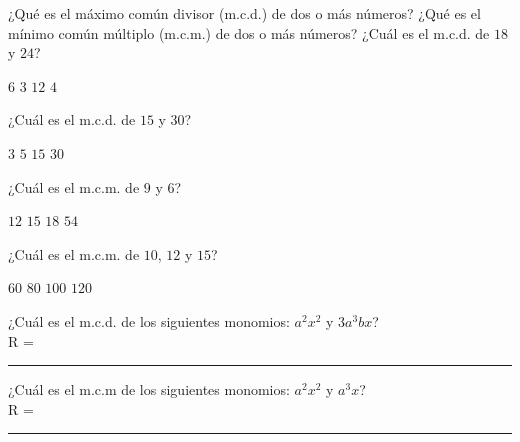 \documentclass[14pt]{exam}
\begin{document}
\begin{questions}
    \question ¿Qué es el máximo común divisor (m.c.d.) de dos o más números?
    \vspace{2em}
    \question ¿Qué es el mínimo común múltiplo (m.c.m.) de dos o más números?
    \vspace{2em}
    \question ¿Cuál es el m.c.d. de $18$ y $24$?
    \\[0.5em]
    \begin{oneparchoices}
        \choice $6$
        \choice $3$
        \choice $12$
        \choice $4$
    \end{oneparchoices}
    \question ¿Cuál es el m.c.d. de $15$ y $30$?
    \\[0.5em]
    \begin{oneparchoices}
        \choice $3$
        \choice $5$
        \choice $15$
        \choice $30$
    \end{oneparchoices}
    \question ¿Cuál es el m.c.m. de $9$ y $6$?
    \\[0.5em]
    \begin{oneparchoices}
        \choice $12$
        \choice $15$
        \choice $18$
        \choice $54$
    \end{oneparchoices}
    \question ¿Cuál es el m.c.m. de $10$, $12$ y $15$?
    \\[0.5em]
    \begin{oneparchoices}
        \choice $60$
        \choice $80$
        \choice $100$
        \choice $120$
    \end{oneparchoices}
    \question ¿Cuál es el m.c.d. de los siguientes monomios: $a^{2} x^{2}$ y $3 a^{3} b x$? \\[0.5em]
    R = \rule{3cm}{0.1mm}
    \question ¿Cuál es el m.c.m de los siguientes monomios: $a^{2} x^{2}$ y $a^{3} x$? \\[0.5em]
    R = \rule{3cm}{0.1mm}
\end{questions}
\end{document}
